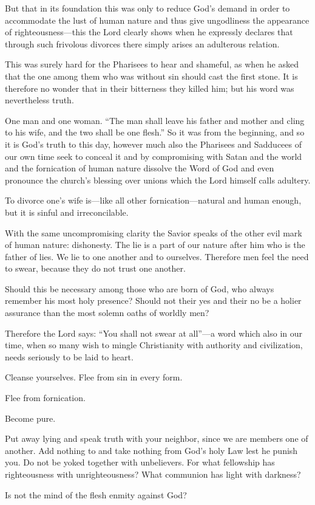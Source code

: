 But that in its foundation this was only to reduce God’s demand in order to accommodate the lust of human nature and thus give ungodliness the appearance of righteousness—this the Lord clearly shows when he expressly declares that through such frivolous divorces there simply arises an adulterous relation.

This was surely hard for the Pharisees to hear and shameful, as when he asked that the one among them who was without sin should cast the first stone. It is therefore no wonder that in their bitterness they killed him; but his word was nevertheless truth.

One man and one woman. “The man shall leave his father and mother and cling to his wife, and the two shall be one flesh.” So it was from the beginning, and so it is God’s truth to this day, however much also the Pharisees and Sadducees of our own time seek to conceal it and by compromising with Satan and the world and the fornication of human nature dissolve the Word of God and even pronounce the church’s blessing over unions which the Lord himself calls adultery.

To divorce one’s wife is—like all other fornication—natural and human enough, but it is sinful and irreconcilable.

With the same uncompromising clarity the Savior speaks of the other evil mark of human nature: dishonesty. The lie is a part of our nature after him who is the father of lies. We lie to one another and to ourselves. Therefore men feel the need to swear, because they do not trust one another.

Should this be necessary among those who are born of God, who always remember his most holy presence? Should not their yes and their no be a holier assurance than the most solemn oaths of worldly men?

Therefore the Lord says: “You shall not swear at all”—a word which also in our time, when so many wish to mingle Christianity with authority and civilization, needs seriously to be laid to heart.

Cleanse yourselves. Flee from sin in every form. 

Flee from fornication. 

Become pure. 

Put away lying and speak truth with your neighbor, since we are members one of another. Add nothing to and take nothing from God’s holy Law lest he punish you. Do not be yoked together with unbelievers. For what fellowship has righteousness with unrighteousness? What communion has light with darkness?

Is not the mind of the flesh enmity against God?

